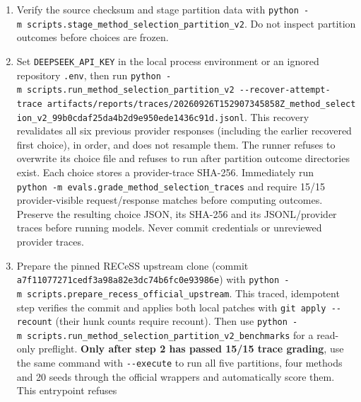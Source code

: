 \documentclass[
  10pt,
]{ctexart}
\providecommand{\tightlist}{%
  \setlength{\itemsep}{0pt}\setlength{\parskip}{0pt}}
\begin{document}
\begin{enumerate}
\def\labelenumi{\arabic{enumi}.}
\tightlist
\item
  Verify the source checksum and stage partition data with
  \texttt{python\ -m\ scripts.\allowbreak{}stage\_\allowbreak{}method\_\allowbreak{}selection\_\allowbreak{}partition\_\allowbreak{}v2}.
  Do not inspect partition outcomes before choices are frozen.
\item
  Set \texttt{DEEPSEEK\_\allowbreak{}API\_\allowbreak{}KEY} in the local process environment or an
  ignored repository \texttt{.\allowbreak{}env}, then run
  \texttt{python\ -m\ scripts.\allowbreak{}run\_\allowbreak{}method\_\allowbreak{}selection\_\allowbreak{}partition\_\allowbreak{}v2\ -\/\allowbreak{}-recover-attempt-trace\ artifacts/\allowbreak{}reports/\allowbreak{}traces/\allowbreak{}20260926T152907345858Z\_\allowbreak{}method\_\allowbreak{}selection\_\allowbreak{}v2\_\allowbreak{}99b0cdaf25da4b\allowbreak{}2d9e950ede1436\allowbreak{}c91d.\allowbreak{}jsonl}.
  This recovery revalidates all six previous provider responses
  (including the earlier recovered first choice), in order, and does not
  resample them. The runner refuses to overwrite its choice file and
  refuses to run after partition outcome directories exist. Each choice
  stores a provider-trace SHA-256. Immediately run
  \texttt{python\ -m\ evals.\allowbreak{}grade\_\allowbreak{}method\_\allowbreak{}selection\_\allowbreak{}traces} and
  require 15/15 provider-visible request/response matches before
  computing outcomes. Preserve the resulting choice JSON, its SHA-256
  and its JSONL/provider traces before running models. Never commit
  credentials or unreviewed provider traces.
\item
  Prepare the pinned RECeSS upstream clone (commit
  \texttt{a7f11077271ced\allowbreak{}f3a98a82e3dc74\allowbreak{}b6fc0e93986e}) with
  \texttt{python\ -m\ scripts.\allowbreak{}prepare\_\allowbreak{}recess\_\allowbreak{}official\_\allowbreak{}upstream}. This
  traced, idempotent step verifies the commit and applies both local
  patches with \texttt{git\ apply\ -\/\allowbreak{}-recount} (their hunk counts
  require recount). Then use
  \texttt{python\ -m\ scripts.\allowbreak{}run\_\allowbreak{}method\_\allowbreak{}selection\_\allowbreak{}partition\_\allowbreak{}v2\_\allowbreak{}benchmarks}
  for a read-only preflight. \textbf{Only after step 2 has passed 15/15
  trace grading}, use the same command with \texttt{-\/\allowbreak{}-execute} to run
  all five partitions, four methods and 20 seeds through the official
  wrappers and automatically score them. This entrypoint refuses

\end{enumerate}
\end{document}
